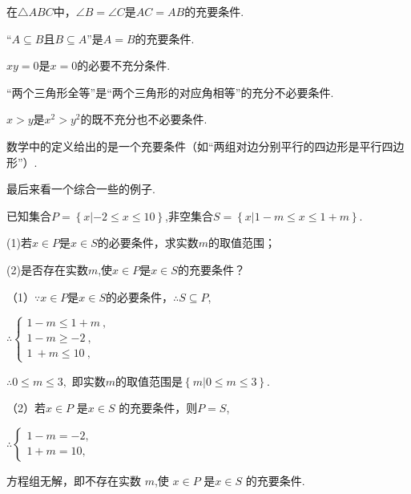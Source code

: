 \documentclass[lang=cn,math=cm,chinesefont=nofont,11pt,scheme=chinese,twocol]{elegantbook}
\begin{document}
\begin{example}
  在$\triangle ABC$中，$\angle B=\angle C$是$AC=AB$的充要条件.
\end{example}

\begin{example}
  “$A\subseteq B$且$B\subseteq A”$是$A=B$的充要条件.
\end{example}

\begin{example}
  $xy=0$是$x=0$的必要不充分条件.
\end{example}

\begin{example}
  “两个三角形全等”是“两个三角形的对应角相等”的充分不必要条件.
\end{example}

\begin{example}
  $x>y$是$x^2>y^2$的既不充分也不必要条件.
\end{example}

\begin{example}
  数学中的定义给出的是一个充要条件（如“两组对边分别平行的四边形是平行四边形”）.
\end{example}

\hspace*{\fill}

最后来看一个综合一些的例子.

\begin{example}\label{2022BST_Math_BX1_RJA_P18.20}
  已知集合$P=\left\{x|-2\leq x\leqslant10\right\}$,非空集合$S=\left\{x|1-m\leqslant x\leqslant1+m\right\}.$

  (1)若$x\in P$是$x\in S$的必要条件，求实数$m$的取值范围；

  (2)是否存在实数$m$,使$x\in P$是$x\in S$的充要条件？
\end{example}

\begin{solution}
  （1）$\because x\in P$是$x\in S$的必要条件，$\therefore S\subseteq P$,

  $\therefore\begin{cases}1-m\leqslant1+m\:,\\1-m\geqslant-2\:,\\1\:+m\leqslant10\:,\end{cases}$
  
  $\therefore 0\leqslant m\leqslant 3,$
  即实数$m$的取值范围是$\left\{m|0\leqslant m\leqslant3\right\}.$

  （2）若$x\in P$ 是$x\in S$ 的充要条件，则$P=S$,

  $\therefore\begin{cases}1-m=-2,\\1+m=10,\end{cases}$
  
  方程组无解，即不存在实数 $m$,使 $x\in P$ 是$x\in S$ 的充要条件.
\end{solution}
\end{document}
